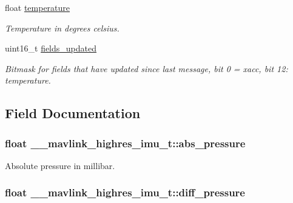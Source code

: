 \begin{DoxyCompactItemize}
float \hyperlink{struct____mavlink__highres__imu__t_add75673ef20a41e9548b3b583762d4b4}{temperature}
\begin{DoxyCompactList}\small\item\em Temperature in degrees celsius. \end{DoxyCompactList}\item 
uint16\+\_\+t \hyperlink{struct____mavlink__highres__imu__t_a0723ff71a7057f3f96eb64ac73be64dc}{fields\+\_\+updated}
\begin{DoxyCompactList}\small\item\em Bitmask for fields that have updated since last message, bit 0 = xacc, bit 12\+: temperature. \end{DoxyCompactList}\end{DoxyCompactItemize}


\subsection{Field Documentation}
\hypertarget{struct____mavlink__highres__imu__t_a0db713a894b40a11ee5b0cddc1629353}{
\subsubsection[{abs\+\_\+pressure}]{\setlength{\rightskip}{0pt plus 5cm}float \+\_\+\+\_\+mavlink\+\_\+highres\+\_\+imu\+\_\+t\+::abs\+\_\+pressure}}\label{struct____mavlink__highres__imu__t_a0db713a894b40a11ee5b0cddc1629353}


Absolute pressure in millibar. 

\hypertarget{struct____mavlink__highres__imu__t_a5902061bb3028121e55ce9641e844334}{
\subsubsection[{diff\+\_\+pressure}]{\setlength{\rightskip}{0pt plus 5cm}float \+\_\+\+\_\+mavlink\+\_\+highres\+\_\+imu\+\_\+t\+::diff\+\_\+pressure}}\label{struct____mavlink__highres__imu__t_a5902061bb3028121e55ce9641e844334}


